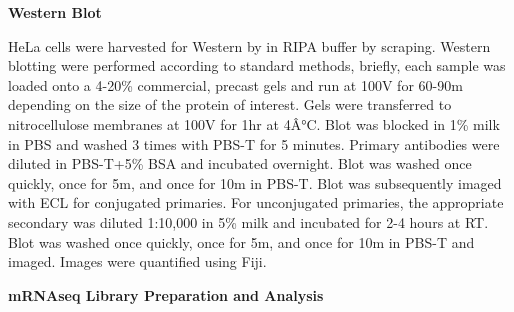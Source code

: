 \documentclass[12pt,oneside]{reedthesis}
\begin{document}
\textbf{Western Blot}

HeLa cells were harvested for Western by in RIPA buffer by scraping. Western blotting were performed according to standard methods, briefly, each sample was loaded onto a 4-20\% commercial, precast gels and run at 100V for 60-90m depending on the size of the protein of interest. Gels were transferred to nitrocellulose membranes at 100V for 1hr at 4Â°C. Blot was blocked in 1\% milk in PBS and washed 3 times with PBS-T for 5 minutes. Primary antibodies were diluted in PBS-T+5\% BSA and incubated overnight. Blot was washed once quickly, once for 5m, and once for 10m in PBS-T. Blot was subsequently imaged with ECL for conjugated primaries. For unconjugated primaries, the appropriate secondary was diluted 1:10,000 in 5\% milk and incubated for 2-4 hours at RT. Blot was washed once quickly, once for 5m, and once for 10m in PBS-T and imaged. Images were quantified using Fiji.

\textbf{mRNAseq Library Preparation and Analysis}
\end{document}

